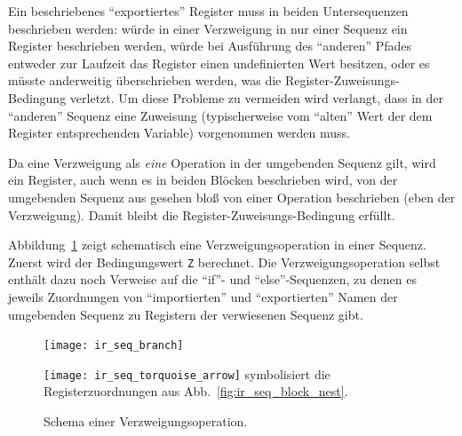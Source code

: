 \documentclass[twoside,a4paper,fleqn,12pt]{book}
\begin{document}
Ein beschriebenes "`exportiertes"' Register muss in beiden Untersequenzen beschrieben werden: würde in einer Verzweigung
in nur einer Sequenz ein Register beschrieben werden, würde bei Ausführung des "`anderen"' Pfades entweder zur Laufzeit das Register einen undefinierten Wert besitzen, oder
es müsste anderweitig überschrieben werden, was die Register-Zuweisungs-Bedingung verletzt. Um diese Probleme zu vermeiden wird verlangt,
dass in der "`anderen"' Sequenz eine Zuweisung (typischerweise vom "`alten"' Wert der dem Register entsprechenden Variable) vorgenommen werden muss.

Da eine Verzweigung als \emph{eine} Operation in der umgebenden Sequenz gilt, wird ein Register, auch wenn es in beiden Blöcken beschrieben wird, 
von der umgebenden Sequenz aus gesehen bloß von einer Operation beschrieben (eben der Verzweigung). Damit bleibt die Register-Zuweisungs-Bedingung erfüllt.



Abbildung~\ref{fig:ir_seq_branch} zeigt schematisch eine Verzweigungsoperation in einer Sequenz.
Zuerst wird der Bedingungswert \texttt{Z} berechnet. Die Verzweigungsoperation selbst enthält dazu noch
Verweise auf die ``if''- und ``else''-Sequenzen, zu denen es jeweils Zuordnungen von "`importierten"' und "`exportierten"' 
Namen der umgebenden Sequenz zu Registern der verwiesenen Sequenz gibt.

\begin{figure}[h]
   \centering
  \texttt{[image: ir\_seq\_branch]}
  \caption{Schema einer Verzweigungsoperation.}
  \small\texttt{[image: ir\_seq\_torquoise\_arrow]} symbolisiert die Registerzuordnungen aus Abb.~\ref{fig:ir_seq_block_nest}.
  \label{fig:ir_seq_branch}
\end{figure}

\end{document}
